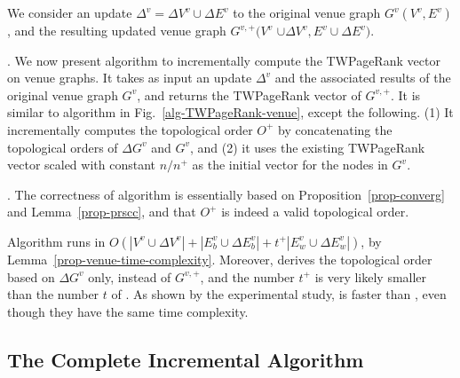 {We consider an update $\Delta^v=\Delta V^v\cup\Delta E^v$ to the original venue graph $G^v(V^v, E^v)$, and the resulting updated venue graph $G^{v,+}(V^v$ $\cup \Delta V^v, E^v\cup\Delta E^v )$.

. We now present algorithm \inctwprscc to incrementally compute the TWPageRank vector on venue graphs. It takes as input an update
 $\Delta^v$ and the associated results of the original venue graph $G^v$, and returns the TWPageRank vector of $G^{v,+}$. It is similar to algorithm \twprscc in Fig.~\ref{alg-TWPageRank-venue}, except the following. (1) It incrementally computes the topological order $O^+$ by concatenating the topological orders of $\Delta G^v$ and $G^v$, and (2) it uses the existing TWPageRank vector scaled with constant ${n}/{n^+}$ as the initial vector for the nodes in $G^v$.




. The correctness of algorithm \inctwprscc is essentially based on Proposition~\ref{prop-converg} and Lemma~\ref{prop-prscc}, and that $O^+$ is indeed a valid topological order.

Algorithm \inctwprscc runs in $O(|V^v\cup \Delta V^v|+|E^v_b\cup \Delta E^v_b|+t^+|E^v_{w}\cup \Delta E^v_w|)$, by Lemma~\ref{prop-venue-time-complexity}. Moreover, \inctwprscc derives the topological order based  on $\Delta G^v$ only, instead of $G^{v,+}$, and the number $t^+$ is very likely smaller than the number $t$ of \twprscc.  As shown by the experimental study, \inctwprscc is faster than \twprscc, even though they have the same time complexity.


\subsection{The Complete Incremental Algorithm}
\label{subsec-inc-alg}

}
